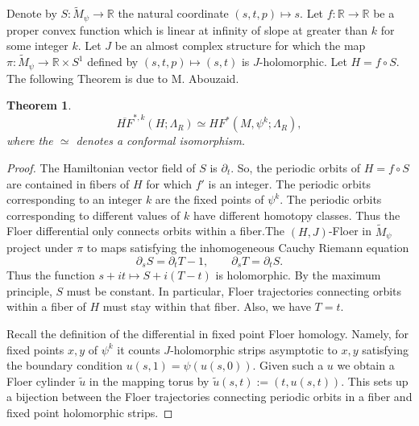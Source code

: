 \documentclass[11pt]{amsart}
\newcommand{\R}{\mathbb{R}}
\newtheorem{tm}{Theorem}[section]
\theoremstyle{definition}
\theoremstyle{remark}
\begin{document}
Denote by $S:\tilde{M}_\psi\to\R$ the natural coordinate $(s,t,p)\mapsto s$. Let $f:\R\to\R$ be a proper convex function which is linear at infinity of slope at greater than $k$ for some integer $k$.  Let $J$ be an almost complex structure for which the map $\pi:\tilde{M}_\psi\to \R\times S^1$ defined by $(s,t,p)\mapsto (s,t)$ is $J$-holomorphic. Let $H=f\circ S$. The following Theorem is due to M. Abouzaid.
\begin{tm}
\begin{equation}\label{EqFixFloH}
\overline{HF}^{*,k}(H;\Lambda_R)\simeq HF^*(M,\psi^k;\Lambda_R),
\end{equation}
where the $\simeq$ denotes a conformal isomorphism.
\end{tm}
\begin{proof}
The Hamiltonian vector field of $S$ is $\partial_t$. So, the periodic orbits of $H=f\circ S$ are contained in fibers of $H$  for which $f'$ is an integer. The periodic orbits corresponding to an integer $k$ are the fixed points of $\psi^k$.  The periodic orbits corresponding to different values of $k$ have different homotopy classes. Thus the Floer differential only connects orbits within a fiber.The $(H,J)$-Floer in $\tilde{M}_\psi$ project under $\pi$ to maps satisfying the inhomogeneous Cauchy Riemann equation
\[
\partial_sS=\partial_tT-1,\qquad \partial_sT=\partial_tS.
\]
Thus the function $s+it\mapsto S+i(T-t)$ is holomorphic. By the maximum principle, $S$ must be constant. In particular, Floer trajectories connecting orbits within a fiber of $H$ must stay within that fiber. Also, we have $T=t$.

Recall the definition of the differential in fixed point Floer homology. Namely, for fixed points $x,y$ of $\psi^k$  it counts $J$-holomorphic strips asymptotic to $x,y$ satisfying the boundary condition $u(s,1)=\psi(u(s,0))$. Given such a $u$ we obtain a Floer cylinder $\tilde{u}$ in the mapping torus by $\tilde{u}(s,t):=(t,u(s,t))$. This sets up a bijection between the
Floer trajectories connecting periodic orbits in a fiber and fixed point holomorphic strips.
\end{proof}

\end{document}

